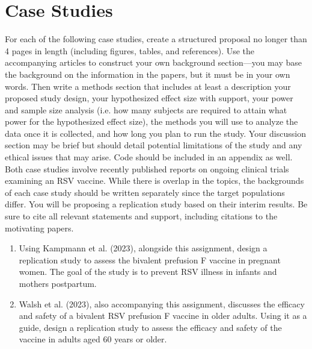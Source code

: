 \documentclass{article}
\begin{document}
	\section*{Case Studies}
	For each of the following case studies, create a structured proposal no longer than 4 pages in length (including figures, tables, and references). Use the accompanying articles to construct your own background section---you may base the background on the information in the papers, but it must be in your own words. Then write a methods section that includes at least a description your proposed study design, your hypothesized effect size with support, your power and sample size analysis (i.e. how many subjects are required to attain what power for the hypothesized effect size), the methods you will use to analyze the data once it is collected, and how long you plan to run the study. Your discussion section may be brief but should detail potential limitations of the study and any ethical issues that may arise. Code should be included in an appendix as well. Both case studies involve recently published reports on ongoing clinical trials examining an RSV vaccine. While there is overlap in the topics, the backgrounds of each case study should be written separately since the target populations differ. You will be proposing a replication study based on their interim results. Be sure to cite all relevant statements and support, including citations to the motivating papers.

	\begin{enumerate}
		\item Using Kampmann et al. (2023), alongside this assignment, design a replication study to assess the bivalent prefusion F vaccine in pregnant women. The goal of the study is to prevent RSV illness in infants and mothers postpartum.
		
		\item Walsh et al. (2023), also accompanying this assignment, discusses the efficacy and safety of a bivalent RSV
prefusion F vaccine in older adults. Using it as a guide, design a replication study to assess the efficacy and safety of the vaccine in adults aged 60 years or older.

	
	\end{enumerate}
		
\end{document}
